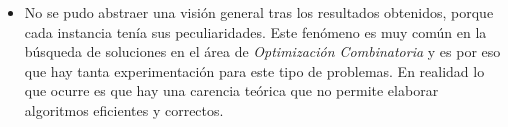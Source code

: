 \begin{itemize}
\item No se pudo abstraer una visión general tras los resultados obtenidos, porque cada instancia tenía sus peculiaridades. Este fenómeno es muy común en la búsqueda de soluciones en el área de \emph{Optimización Combinatoria} y es por eso que hay tanta experimentación para este tipo de problemas. En realidad lo que ocurre es que hay una carencia teórica que no permite elaborar algoritmos eficientes y correctos.

\end{itemize}
